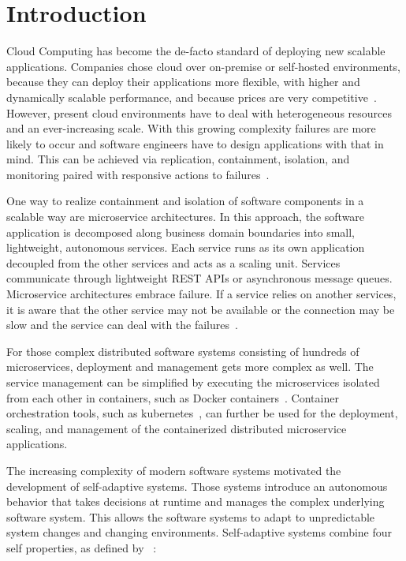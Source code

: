
\section{Introduction}\label{sec:introduction}

  Cloud Computing has become the de-facto standard of deploying new scalable applications.
  Companies chose cloud over on-premise or self-hosted environments, because they can deploy their applications more flexible, with higher and dynamically scalable performance, and because prices are very competitive~\cite{ToffettiMicroservices}.
  However, present cloud environments have to deal with heterogeneous resources and an ever-increasing scale.
  With this growing complexity failures are more likely to occur and software engineers have to design applications with that in mind.
  This can be achieved via replication, containment, isolation, and monitoring paired with responsive actions to failures~\cite{reactivemanifesto}.

  One way to realize containment and isolation of software components in a scalable way are microservice architectures.
  In this approach, the software application is decomposed along business domain boundaries into small, lightweight, autonomous services.
  Each service runs as its own application decoupled from the other services and acts as a scaling unit.
  Services communicate through lightweight REST APIs or asynchronous message queues.
  Microservice architectures embrace failure.
  If a service relies on another services, it is aware that the other service may not be available or the connection may be slow and the service can deal with the failures~\cite{microservices}.

  For those complex distributed software systems consisting of hundreds of microservices, deployment and management gets more complex as well.
  The service management can be simplified by executing the microservices isolated from each other in containers, such as Docker containers~\cite{docker}.
  Container orchestration tools, such as \gls{kubernetes}~\cite{kubernetes}, can further be used for the deployment, scaling, and management of the containerized distributed microservice applications.

  The increasing complexity of modern software systems motivated the development of self-adaptive systems.
  Those systems introduce an autonomous behavior that takes decisions at runtime and manages the complex underlying software system.
  This allows the software systems to adapt to unpredictable system changes and changing environments.
  Self-adaptive systems combine four self properties, as defined by \citeauthor{Ganek}~\cite{Ganek}:

